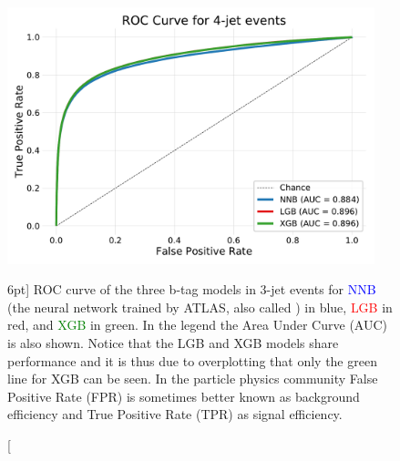 \documentclass[a4paper, twoside, nobib]{tufte-book}
\newcommand{\code}[1]{\colorbox{light-gray}{\texttt{\detokenize{#1}}}}
\begin{document}
\begin{figure}
  \includegraphics[width=0.95\textwidth, trim=10 10 10 40, clip]{figures/quarks/ROC_4_jet-down_sample=1.00-ML_vars=vertex-selection=b-ejet_min=4-n_iter_RS_lgb=99-n_iter_RS_xgb=9-cdot_cut=0.90-version=19.pdf}
  \caption[ROC curve for b-tag in 4-jet events][6pt]
          {ROC curve of the three b-tag models in 3-jet events for \textcolor{blue}{NNB} (the neural network trained by ATLAS, also called \code{nnbjet}) in blue, \textcolor{red}{LGB} in red, and \textcolor{green}{XGB} in green. In the legend the Area Under Curve (AUC) is also shown. Notice that the LGB and XGB models share performance and it is thus due to overplotting that only the green line for XGB can be seen. In the particle physics community False Positive Rate (FPR) is sometimes better known as background efficiency and True Positive Rate (TPR) as signal efficiency.  
          } 
  \label{fig:q:roc_btag_4j}
\end{figure}
\end{document}
